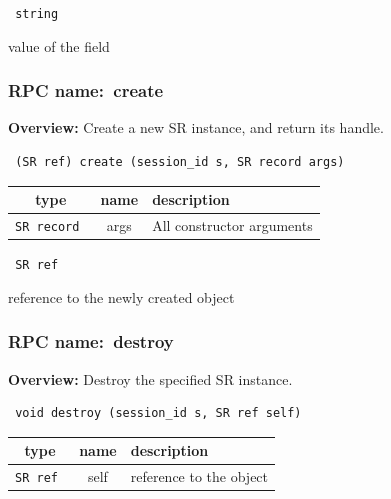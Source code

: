 \vspace{0.3cm}

{\tt 
string
}


value of the field
\vspace{0.3cm}
\vspace{0.3cm}
\vspace{0.3cm}
\subsubsection{RPC name:~create}

{\bf Overview:} 
Create a new SR instance, and return its handle.

\begin{verbatim} (SR ref) create (session_id s, SR record args)\end{verbatim}



 
\vspace{0.3cm}
\begin{tabular}{|c|c|p{7cm}|}
 \hline
{\bf type} & {\bf name} & {\bf description} \\ \hline
{\tt SR record } & args & All constructor arguments \\ \hline 

\end{tabular}

\vspace{0.3cm}

{\tt 
SR ref
}


reference to the newly created object
\vspace{0.3cm}
\vspace{0.3cm}
\vspace{0.3cm}
\subsubsection{RPC name:~destroy}

{\bf Overview:} 
Destroy the specified SR instance.

\begin{verbatim} void destroy (session_id s, SR ref self)\end{verbatim}



 
\vspace{0.3cm}
\begin{tabular}{|c|c|p{7cm}|}
 \hline
{\bf type} & {\bf name} & {\bf description} \\ \hline
{\tt SR ref } & self & reference to the object \\ \hline 

\end{tabular}

